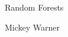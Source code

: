 \begin{center}
\begin{LARGE}
Random Forests
\end{LARGE}

\bigskip
\bigskip

\begin{Large}
Mickey Warner
\end{Large}

\end{center}
